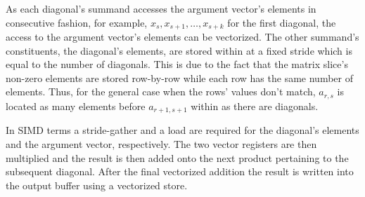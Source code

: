       As each diagonal's summand accesses the argument vector's elements in consecutive fashion, for example, $x_s, x_{s+1}, \ldots, x_{s + k}$ for the first diagonal, the access to the argument vector's elements can be vectorized. The other summand's constituents, the diagonal's elements, are stored within \V at a fixed stride which is equal to the number of diagonals. This is due to the fact that the matrix slice's non-zero elements are stored row-by-row while each row has the same number of elements. Thus, for the general case when the rows' values don't match, $a_{r, s}$ is located as many elements before $a_{r+1, s+1}$ within \V as there are diagonals.

      In SIMD terms a stride-gather and a load are required for the diagonal's elements and the argument vector, respectively. The two vector registers are then multiplied and the result is then added onto the next product pertaining to the subsequent diagonal. After the final vectorized addition the result is written into the output buffer using a vectorized store.


